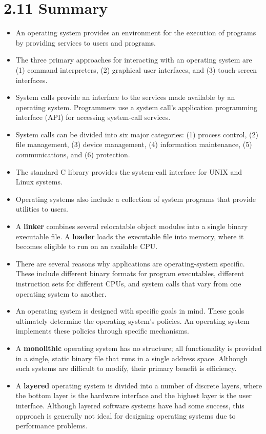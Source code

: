 \section*{2.11 Summary}

\begin{itemize}
    \item An operating system provides an environment for the execution of programs by providing services to users and programs.
    \item The three primary approaches for interacting with an operating system are (1) command interpreters, (2) graphical user interfaces, and (3) touch-screen interfaces.
    \item System calls provide an interface to the services made available by an operating system. Programmers use a system call's application programming interface (API) for accessing system-call services.
    \item System calls can be divided into six major categories: (1) process control, (2) file management, (3) device management, (4) information maintenance, (5) communications, and (6) protection.
    \item The standard C library provides the system-call interface for UNIX and Linux systems.
    \item Operating systems also include a collection of system programs that provide utilities to users.
    \item A \textbf{linker} combines several relocatable object modules into a single binary executable file. A \textbf{loader} loads the executable file into memory, where it becomes eligible to run on an available CPU.
    \item There are several reasons why applications are operating-system specific. These include different binary formats for program executables, different instruction sets for different CPUs, and system calls that vary from one operating system to another.
    \item An operating system is designed with specific goals in mind. These goals ultimately determine the operating system's policies. An operating system implements these policies through specific mechanisms.
    \item A \textbf{monolithic} operating system has no structure; all functionality is provided in a single, static binary file that runs in a single address space. Although such systems are difficult to modify, their primary benefit is efficiency.
    \item A \textbf{layered} operating system is divided into a number of discrete layers, where the bottom layer is the hardware interface and the highest layer is the user interface. Although layered software systems have had some success, this approach is generally not ideal for designing operating systems due to performance problems.

\end{itemize}
